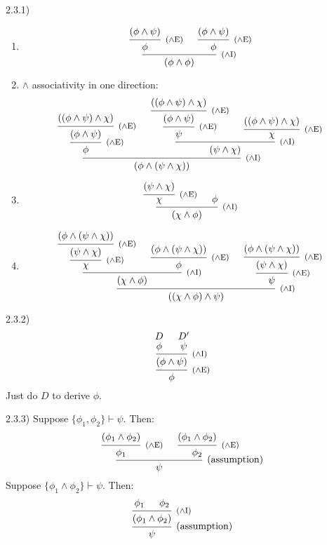 \documentclass{article}
\theoremstyle{definition}
\newcommand{\ci}{\footnotesize ($\wedge$I)}
\newcommand{\ce}{\footnotesize ($\wedge$E)}
\begin{document}
2.3.1)
\begin{enumerate}[label=(\alph*)]
  \item
  \[
    \begin{prooftree}
      \hypo{(\phi\land\psi)}
      \infer1[\ce]{\phi}
      \hypo{(\phi\land\psi)}
      \infer1[\ce]{\phi}
      \infer2[\ci]{(\phi\land\phi)}
    \end{prooftree}
  \]

  \item \(\land\) associativity in one direction:
  \[
    \begin{prooftree}
      \hypo{((\phi\land\psi)\land\chi)}
      \infer1[\ce]{(\phi\land\psi)}
      \infer1[\ce]{\phi}
      \hypo{((\phi\land\psi)\land\chi)}
      \infer1[\ce]{(\phi\land\psi)}
      \infer1[\ce]{\psi}
      \hypo{((\phi\land\psi)\land\chi)}
      \infer1[\ce]{\chi}
      \infer2[\ci]{(\psi\land\chi)}
      \infer2[\ci]{(\phi\land(\psi\land\chi))}
    \end{prooftree}
  \]
  \item 
  \[
    \begin{prooftree}
      \hypo{(\psi\land\chi)}
      \infer1[\ce]{\chi}
      \hypo{\phi}
      \infer2[\ci]{(\chi\land\phi)}
    \end{prooftree}
  \]
  \item 
  \[
    \begin{prooftree}
      \hypo{(\phi\land(\psi\land\chi))}
      \infer1[\ce]{(\psi\land\chi)}
      \infer1[\ce]{\chi}
      \hypo{(\phi\land(\psi\land\chi))}
      \infer1[\ce]{\phi}
      \infer2[\ci]{(\chi\land\phi)}
      \hypo{(\phi\land(\psi\land\chi))}
      \infer1[\ce]{(\psi\land\chi)}
      \infer1[\ce]{\psi}
      \infer2[\ci]{((\chi\land\phi)\land\psi)}
    \end{prooftree}
  \]
\end{enumerate}

2.3.2)
  \[
    \begin{prooftree}
      \hypo{D}
      \infer[rule style=no rule]1{\phi}
      \hypo{D'}
      \infer[rule style=no rule]1{\psi}
      \infer2[\ci]{(\phi\land\psi)}
      \infer1[\ce]{\phi}
    \end{prooftree}
  \]
  Just do $D$ to derive $\phi$.

2.3.3) Suppose \(\{\phi_1, \phi_2\} \vdash \psi\). Then:
  \[
    \begin{prooftree}
      \hypo{(\phi_1\land\phi_2)}
      \infer1[\ce]{\phi_1}
      \hypo{(\phi_1\land\phi_2)}
      \infer1[\ce]{\phi_2}
      \infer2[(assumption)]{\psi}
    \end{prooftree}
  \]
Suppose \(\{\phi_1\land\phi_2\} \vdash \psi\). Then:
  \[
    \begin{prooftree}
      \hypo{\phi_1}
      \hypo{\phi_2}
      \infer2[\ci]{(\phi_1\land\phi_2)}
      \infer1[(assumption)]{\psi}
    \end{prooftree}
  \]
\end{document}
